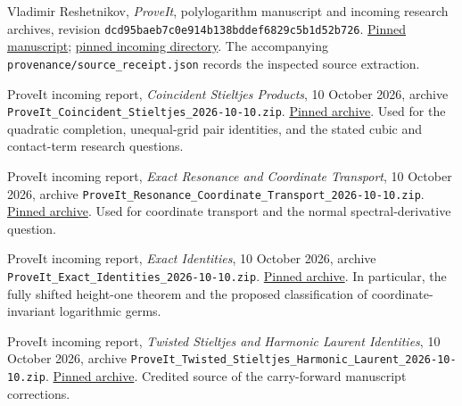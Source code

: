 Vladimir Reshetnikov, \emph{ProveIt}, polylogarithm manuscript and
incoming research archives, revision
\texttt{dcd95baeb7c0e914b138bddef6829c5b1d52b726}.
\href{https://github.com/VladimirReshetnikov/ProveIt/tree/dcd95baeb7c0e914b138bddef6829c5b1d52b726/Analysis/Polylogarithms/docs/manuscript}{Pinned manuscript};
\href{https://github.com/VladimirReshetnikov/ProveIt/tree/dcd95baeb7c0e914b138bddef6829c5b1d52b726/docs/incoming}{pinned incoming directory}.
The accompanying \texttt{provenance/source\_receipt.json} records the
inspected source extraction.

ProveIt incoming report, \emph{Coincident Stieltjes Products},
10 October 2026, archive
\texttt{ProveIt\_Coincident\_Stieltjes\_2026-10-10.zip}.
\href{https://github.com/VladimirReshetnikov/ProveIt/blob/dcd95baeb7c0e914b138bddef6829c5b1d52b726/docs/incoming/ProveIt_Coincident_Stieltjes_2026-10-10.zip}{Pinned archive}.
Used for the quadratic completion, unequal-grid pair identities, and
the stated cubic and contact-term research questions.

ProveIt incoming report, \emph{Exact Resonance and Coordinate
Transport}, 10 October 2026, archive
\texttt{ProveIt\_Resonance\_Coordinate\_Transport\_2026-10-10.zip}.
\href{https://github.com/VladimirReshetnikov/ProveIt/blob/dcd95baeb7c0e914b138bddef6829c5b1d52b726/docs/incoming/ProveIt_Resonance_Coordinate_Transport_2026-10-10.zip}{Pinned archive}.
Used for coordinate transport and the normal spectral-derivative
question.

ProveIt incoming report, \emph{Exact Identities}, 10 October 2026,
archive \texttt{ProveIt\_Exact\_Identities\_2026-10-10.zip}.
\href{https://github.com/VladimirReshetnikov/ProveIt/blob/dcd95baeb7c0e914b138bddef6829c5b1d52b726/docs/incoming/ProveIt_Exact_Identities_2026-10-10.zip}{Pinned archive}.
In particular, the fully shifted height-one theorem and the proposed
classification of coordinate-invariant logarithmic germs.

ProveIt incoming report, \emph{Twisted Stieltjes and Harmonic Laurent
Identities}, 10 October 2026, archive
\texttt{ProveIt\_Twisted\_Stieltjes\_Harmonic\_Laurent\_2026-10-10.zip}.
\href{https://github.com/VladimirReshetnikov/ProveIt/blob/dcd95baeb7c0e914b138bddef6829c5b1d52b726/docs/incoming/ProveIt_Twisted_Stieltjes_Harmonic_Laurent_2026-10-10.zip}{Pinned archive}.
Credited source of the carry-forward manuscript corrections.

